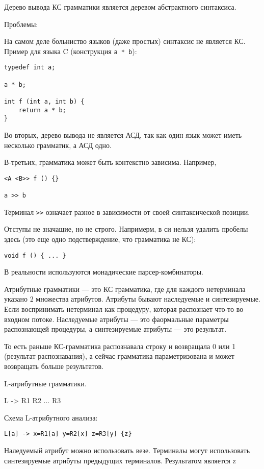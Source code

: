 Дерево вывода КС грамматики является деревом абстрактного синтаксиса.

Проблемы:

На самом деле больниство языков (даже простых) синтаксис не является КС.
Пример для языка C (конструкция \texttt{a * b}):
\begin{verbatim}
typedef int a;

a * b;

int f (int a, int b) {
    return a * b;
}
\end{verbatim}

Во-вторых, дерево вывода не является АСД, так как один язык может иметь
несколько грамматик, а АСД одно.

В-третьих, грамматика может быть контекстно зависима. Например,
\begin{verbatim}
<A <B>> f () {}

a >> b
\end{verbatim}
Терминал \texttt{>>} означает разное в зависимости от своей синтаксической
позиции.

Отступы не значащие, но не строго. Напримерм, в си нельзя удалить пробелы
здесь (это еще одно подстверждение, что грамматика не КС):
\begin{verbatim}
void f () { ... }
\end{verbatim}

В реальности используются монадические парсер-комбинаторы.

Атрибутные грамматики --- это КС грамматика, где для каждого нетерминала
указано 2 множества атрибутов. Атрибуты бывают наследуемые и синтезируемые.
Если воспринимать нетерминал как процедуру, которая распознает что-то во
входном потоке. Наследуемые атрибуты --- это фаормальные параметры распознающей
процедуры, а синтезируемые атрибуты --- это результат.

То есть раньше КС-грамматика распознавала строку и возвращала 0 или 1
(результат распознавания), а сейчас грамматика параметризована и может
возвращать больше результатов.

L-атрибутные грамматики.

L -> R1 R2 ... R3 

Схема L-атрибутного анализа:
\begin{verbatim}
L[a] -> x=R1[a] y=R2[x] z=R3[y] {z}
\end{verbatim}

Наледуемый атрибут можно использовать везе. Терминалы могут использовать
синтезируемые атрибуты предыдущих терминалов. Результатом является z

